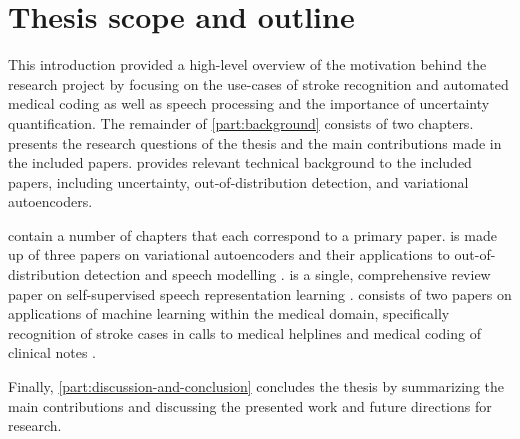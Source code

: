 \section{Thesis scope and outline}

This introduction provided a high-level overview of the motivation behind the research project by focusing on the use-cases of stroke recognition and automated medical coding as well as speech processing and the importance of uncertainty quantification. 
The remainder of \cref{part:background} consists of two chapters. 
 presents the research questions of the thesis and the main contributions made in the included papers. 
 provides relevant technical background to the included papers, including uncertainty, out-of-distribution detection, and variational autoencoders. 

 contain a number of chapters that each correspond to a primary paper. 
 is made up of three papers on variational autoencoders and their applications to out-of-distribution detection and speech modelling \parencite{havtorn_hierarchical_2021,havtorn_benchmarking_2022,bergamin_modelagnostic_2022}. 
 is a single, comprehensive review paper on self-supervised speech representation learning \parencite{mohamed_selfsupervised_2022}. 
 consists of two papers on applications of machine learning within the medical domain, specifically recognition of stroke cases in calls to medical helplines \parencite{wenstrup_retrospective_2023} and medical coding of clinical notes \parencite{edin_automated_2023}. 

Finally, \cref{part:discussion-and-conclusion} concludes the thesis by summarizing the main contributions and discussing the presented work and future directions for research.


